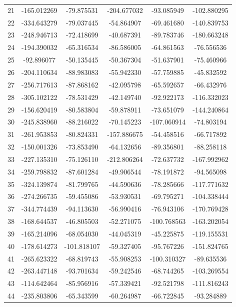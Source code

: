 \documentclass{article}
\theoremstyle{plain}
\theoremstyle{definition}
\theoremstyle{remark}
\begin{document}
\begin{table}[ht!]
\begin{tabular}{rccccc}
21 & -165.012269 & -79.875531 & -204.677032 & -93.085949 & -102.880295 \\
22 & -334.643279 & -79.037445 & -54.864907 & -69.461680 & -140.839753 \\
23 & -248.946713 & -72.418699 & -40.687391 & -89.783746 & -180.663248 \\
24 & -194.390032 & -65.316534 & -86.586005 & -64.861563 & -76.556536 \\
25 & -92.896077 & -50.135445 & -50.367304 & -51.637901 & -75.460966 \\
26 & -204.110634 & -88.983083 & -55.942330 & -57.759885 & -45.832592 \\
27 & -256.717613 & -87.868162 & -42.095798 & -65.592657 & -66.432976 \\
28 & -305.102122 & -78.531429 & -42.149740 & -92.922173 & -116.332023 \\
29 & -156.620419 & -80.583804 & -59.878911 & -73.651079 & -144.240864 \\
30 & -245.838960 & -88.216022 & -70.145223 & -107.060914 & -74.803194 \\
31 & -261.953853 & -80.824331 & -157.886675 & -54.458516 & -66.717892 \\
32 & -150.001326 & -73.853490 & -64.132656 & -89.356801 & -88.258118 \\
33 & -227.135310 & -75.126110 & -212.806264 & -72.637732 & -167.992962 \\
34 & -259.798832 & -87.601284 & -49.906544 & -78.191872 & -94.565098 \\
35 & -324.139874 & -81.799765 & -44.590636 & -78.285666 & -117.771632 \\
36 & -274.266735 & -59.455086 & -53.930531 & -69.795271 & -104.338444 \\
37 & -344.774439 & -94.113630 & -56.990416 & -76.943106 & -170.769428 \\
38 & -168.644537 & -46.805503 & -52.271075 & -100.768563 & -163.202054 \\
39 & -165.214096 & -68.054030 & -44.045319 & -45.225875 & -119.155531 \\
40 & -178.614273 & -101.818107 & -59.327405 & -95.767226 & -151.824765 \\
41 & -265.623322 & -68.819743 & -55.908253 & -100.310327 & -89.635536 \\
42 & -263.447148 & -93.701634 & -59.242546 & -68.744265 & -103.269554 \\
43 & -114.642464 & -85.956916 & -57.339421 & -92.521798 & -111.816243 \\
44 & -235.803806 & -65.343599 & -60.264987 & -66.722845 & -93.284889 \\

\end{tabular}
\end{table}
\end{document}

